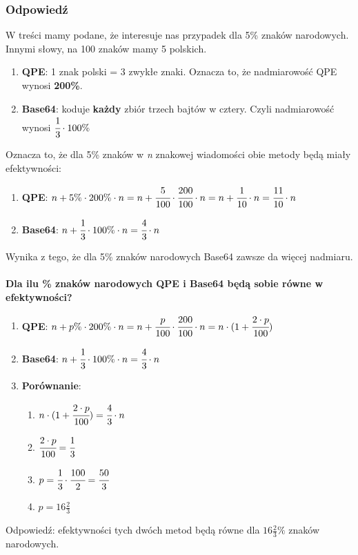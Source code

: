 		\subsubsection{Odpowiedź}
			W treści mamy podane, że interesuje nas przypadek dla 5\% znaków narodowych. Innymi słowy, na 100 znaków mamy 5 polskich.
			\begin{enumerate}
				\item \textbf{QPE}: 1 znak polski = 3 zwykłe znaki. Oznacza to, że nadmiarowość QPE wynosi \textbf{200\%}.
				\item \textbf{Base64}: koduje \textbf{każdy} zbiór trzech bajtów w cztery. Czyli nadmiarowość wynosi $ \cfrac{1}{3}\cdot100\% $
			\end{enumerate}
			Oznacza to, że dla 5\% znaków w \emph{n} znakowej wiadomości obie metody będą miały efektywności:
			\begin{enumerate}
				\item \textbf{QPE}: $ n + 5\%\cdot200\%\cdot n=n+\cfrac{5}{100}\cdot\cfrac{200}{100}\cdot n= n+\cfrac{1}{10}\cdot n=\cfrac{11}{10}\cdot n $
				\item \textbf{Base64}: $ n + \cfrac{1}{3}\cdot100\%\cdot n=\cfrac{4}{3}\cdot n $
			\end{enumerate}
			Wynika z tego, że dla 5\% znaków narodowych Base64 zawsze da więcej nadmiaru.\\\\
			\textbf{Dla ilu \% znaków narodowych QPE i Base64 będą sobie równe w efektywności?}
			\begin{enumerate}
				\item \textbf{QPE}:
				$ n + p\%\cdot200\%\cdot n = n+\cfrac{p}{100}\cdot\cfrac{200}{100}\cdot n=n\cdot(1+\cfrac{2\cdot p}{100})$
				\item \textbf{Base64}:
				$  n + \cfrac{1}{3}\cdot100\%\cdot n=\cfrac{4}{3}\cdot n $
				\item \textbf{Porównanie}:
				\begin{enumerate}
					\item $ n\cdot(1+\cfrac{2\cdot p}{100})= \cfrac{4}{3}\cdot n $
					\item $ \cfrac{2\cdot p}{100}=\cfrac{1}{3} $
					\item $ p=\cfrac{1}{3}\cdot\cfrac{100}{2}=\cfrac{50}{3} $
					\item $ p=16\frac{2}{3} $
				\end{enumerate}
			\end{enumerate}
			Odpowiedź: efektywności tych dwóch metod będą równe dla $ 16\frac{2}{3}\% $ znaków narodowych.
			
